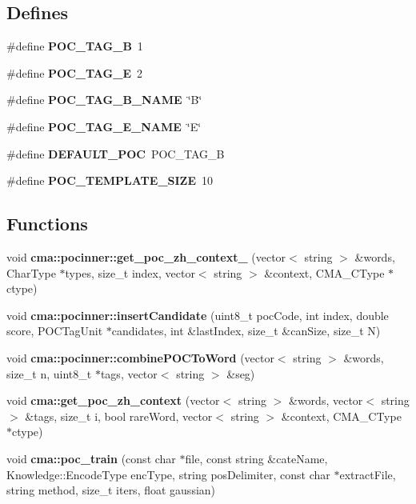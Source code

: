 \subsection*{Defines}
\begin{CompactItemize}
\item 
\#define \textbf{POC\_\-TAG\_\-B}~1\label{CMAPOCTagger_8cc_357022548e14d085e3c93f3906bcccd9}

\item 
\#define \textbf{POC\_\-TAG\_\-E}~2\label{CMAPOCTagger_8cc_9bdb1f3b570b2741da85e468e4d9f6c9}

\item 
\#define \textbf{POC\_\-TAG\_\-B\_\-NAME}~\char`\"{}B\char`\"{}\label{CMAPOCTagger_8cc_d335e18aeb001bbc74ae9991723398d9}

\item 
\#define \textbf{POC\_\-TAG\_\-E\_\-NAME}~\char`\"{}E\char`\"{}\label{CMAPOCTagger_8cc_a88cc556dbff3f12beefe55268610c91}

\item 
\#define \textbf{DEFAULT\_\-POC}~POC\_\-TAG\_\-B\label{CMAPOCTagger_8cc_491f74f500e8d8fba02698dc4035719c}

\item 
\#define \textbf{POC\_\-TEMPLATE\_\-SIZE}~10\label{CMAPOCTagger_8cc_3685a42953194139b2746ed970c98059}

\end{CompactItemize}
\subsection*{Functions}
\begin{CompactItemize}
\item 
void {\bf cma::pocinner::get\_\-poc\_\-zh\_\-context\_} (vector$<$ string $>$ \&words, CharType $\ast$types, size\_\-t index, vector$<$ string $>$ \&context, CMA\_\-CType $\ast$ctype)
\item 
void {\bf cma::pocinner::insertCandidate} (uint8\_\-t pocCode, int index, double score, POCTagUnit $\ast$candidates, int \&lastIndex, size\_\-t \&canSize, size\_\-t N)
\item 
void {\bf cma::pocinner::combinePOCToWord} (vector$<$ string $>$ \&words, size\_\-t n, uint8\_\-t $\ast$tags, vector$<$ string $>$ \&seg)
\item 
void {\bf cma::get\_\-poc\_\-zh\_\-context} (vector$<$ string $>$ \&words, vector$<$ string $>$ \&tags, size\_\-t i, bool rareWord, vector$<$ string $>$ \&context, CMA\_\-CType $\ast$ctype)
\item 
void {\bf cma::poc\_\-train} (const char $\ast$file, const string \&cateName, Knowledge::EncodeType encType, string posDelimiter, const char $\ast$extractFile, string method, size\_\-t iters, float gaussian)
\end{CompactItemize}
